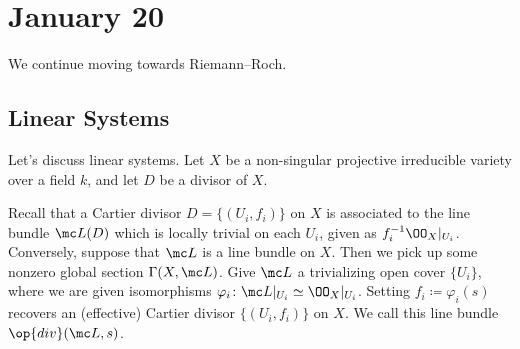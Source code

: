 \documentclass[../notes.tex]{subfiles}
\begin{document}
\section{January 20}

We continue moving towards Riemann--Roch.

\subsection{Linear Systems}
Let's discuss linear systems. Let $X$ be a non-singular projective irreducible variety over a field $k$, and let $D$ be a divisor of $X$.

Recall that a Cartier divisor $D=\{(U_i,f_i)\}$ on $X$ is associated to the line bundle $\mc L(D)$ which is locally trivial on each $U_i$, given as $f_i^{-1}\OO_X|_{U_i}$. Conversely, suppose that $\mc L$ is a line bundle on $X$. Then we pick up some nonzero global section $\Gamma(X,\mc L)$. Give $\mc L$ a trivializing open cover $\{U_i\}$, where we are given isomorphisms $\varphi_i\colon\mc L|_{U_i}\simeq\OO_X|_{U_i}$. Setting $f_i\coloneqq\varphi_i(s)$ recovers an (effective) Cartier divisor $\{(U_i,f_i)\}$ on $X$. We call this line bundle $\op{div}(\mc L,s)$.
\end{document}
